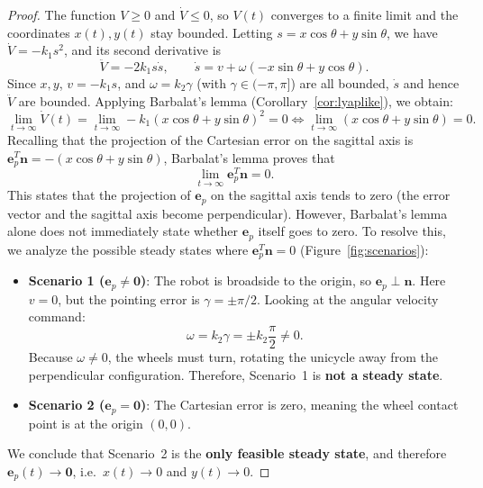 \documentclass[11pt,a4paper]{article}
\theoremstyle{plain}
\theoremstyle{definition}
\theoremstyle{remark}
\begin{document}
\begin{proof}
The function $V\ge0$ and $\dot V\le0$, so $V(t)$ converges to a finite limit and the coordinates $x(t),y(t)$ stay bounded.
Letting $s = x\cos\theta+y\sin\theta$, we have $\dot V = -k_1s^2$, and its second derivative is
\[
\ddot V = -2k_1s\dot s,\qquad \dot s = v + \omega(-x\sin\theta+y\cos\theta).
\]
Since $x,y$, $v = -k_1s$, and $\omega = k_2\gamma$ (with $\gamma\in(-\pi,\pi]$) are all bounded, $\dot s$ and hence $\ddot V$ are bounded.
Applying Barbalat's lemma (Corollary~\ref{cor:lyaplike}), we obtain:
\[
\lim_{t\to\infty} \dot V(t) = \lim_{t\to\infty} -k_1(x\cos\theta+y\sin\theta)^2 = 0 \iff \lim_{t\to\infty}(x\cos\theta+y\sin\theta)=0 .
\]
Recalling that the projection of the Cartesian error on the sagittal axis is $\bm e_p^T\bm n = -(x\cos\theta+y\sin\theta)$, Barbalat's lemma proves that
\[
\lim_{t\to\infty}\bm e_p^T\bm n = 0 .
\]
This states that the projection of $\bm e_p$ on the sagittal axis tends to zero (the error vector and the sagittal axis become perpendicular). However, Barbalat's lemma alone does not immediately state whether $\bm e_p$ itself goes to zero.
To resolve this, we analyze the possible steady states where $\bm e_p^T\bm n = 0$ (Figure~\ref{fig:scenarios}):
\begin{itemize}[leftmargin=*]
\item \textbf{Scenario 1 ($\bm e_p\ne\bm 0$)}: The robot is broadside to the origin, so $\bm e_p\perp\bm n$. Here $v=0$, but the pointing error is $\gamma=\pm\pi/2$. Looking at the angular velocity command:
\[
\omega = k_2\gamma = \pm k_2\frac{\pi}{2} \ne 0.
\]
Because $\omega\ne0$, the wheels must turn, rotating the unicycle away from the perpendicular configuration. Therefore, Scenario~1 is \textbf{not a steady state}.
\item \textbf{Scenario 2 ($\bm e_p=\bm 0$)}: The Cartesian error is zero, meaning the wheel contact point is at the origin $(0,0)$.
\end{itemize}
We conclude that Scenario~2 is the \textbf{only feasible steady state}, and therefore $\bm e_p(t)\to\bm 0$, i.e.\ $x(t)\to0$ and $y(t)\to0$.
\end{proof}
\end{document}
